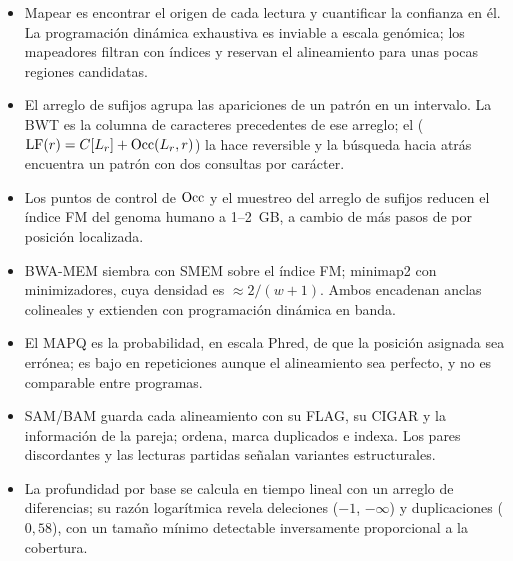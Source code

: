 \begin{resumen}
\begin{itemize}
  \item Mapear es encontrar el origen de cada lectura y cuantificar la confianza en él. La programación dinámica exhaustiva es inviable a escala genómica; los mapeadores filtran con índices y reservan el alineamiento para unas pocas regiones candidatas.
  \item El arreglo de sufijos agrupa las apariciones de un patrón en un intervalo. La BWT es la columna de caracteres precedentes de ese arreglo; el  ($\operatorname{LF}(r)=C[L_r]+\operatorname{Occ}(L_r,r)$) la hace reversible y la búsqueda hacia atrás encuentra un patrón con dos consultas por carácter.
  \item Los puntos de control de $\operatorname{Occ}$ y el muestreo del arreglo de sufijos reducen el índice FM del genoma humano a 1--2~GB, a cambio de más pasos de  por posición localizada.
  \item BWA-MEM siembra con SMEM sobre el índice FM; minimap2 con minimizadores, cuya densidad es $\approx2/(w+1)$. Ambos encadenan anclas colineales y extienden con programación dinámica en banda.
  \item El MAPQ es la probabilidad, en escala Phred, de que la posición asignada sea errónea; es bajo en repeticiones aunque el alineamiento sea perfecto, y no es comparable entre programas.
  \item SAM/BAM guarda cada alineamiento con su FLAG, su CIGAR y la información de la pareja;  ordena, marca duplicados e indexa. Los pares discordantes y las lecturas partidas señalan variantes estructurales.
  \item La profundidad por base se calcula en tiempo lineal con un arreglo de diferencias; su razón logarítmica revela deleciones ($-1$, $-\infty$) y duplicaciones ($0{,}58$), con un tamaño mínimo detectable inversamente proporcional a la cobertura.
\end{itemize}
\end{resumen}

